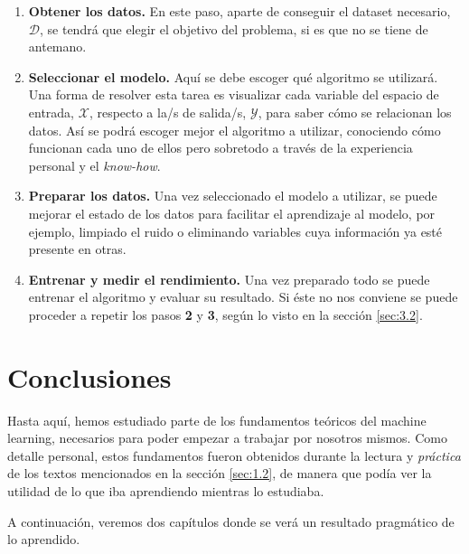 \begin{enumerate}[label=\textbf{\arabic*.},start=1]
  \item \textbf{Obtener los datos.} En este paso, aparte de conseguir el dataset necesario, $\mathcal{D}$, se tendrá que elegir el objetivo del problema, si es que no se tiene de antemano.
  
  \item \textbf{Seleccionar el modelo.} Aquí se debe escoger qué algoritmo se utilizará. Una forma de resolver esta tarea es visualizar cada variable del espacio de entrada, $\mathcal{X}$, respecto a la/s de salida/s, $\mathcal{Y}$, para saber cómo se relacionan los datos. Así se podrá escoger mejor el algoritmo a utilizar, conociendo cómo funcionan cada uno de ellos pero sobretodo a través de la experiencia personal y el \emph{know-how}.
  
  \item \textbf{Preparar los datos.} Una vez seleccionado el modelo a utilizar, se puede mejorar el estado de los datos para facilitar el aprendizaje al modelo, por ejemplo, limpiado el ruido o eliminando variables cuya información ya esté presente en otras.
  
  \item \textbf{Entrenar y medir el rendimiento.} Una vez preparado todo se puede entrenar el algoritmo y evaluar su resultado. Si éste no nos conviene se puede proceder a repetir los pasos \textbf{2} y \textbf{3}, según lo visto en la sección \ref{sec:3.2}.
\end{enumerate}

\section{Conclusiones} \label{sec:3.5}

Hasta aquí, hemos estudiado parte de los fundamentos teóricos del machine learning, necesarios para poder empezar a trabajar por nosotros mismos. Como detalle personal, estos fundamentos fueron obtenidos durante la lectura y \emph{práctica} de los textos mencionados en la sección \ref{sec:1.2}, de manera que podía ver la utilidad de lo que iba aprendiendo mientras lo estudiaba.

A continuación, veremos dos capítulos donde se verá un resultado pragmático de lo aprendido.
